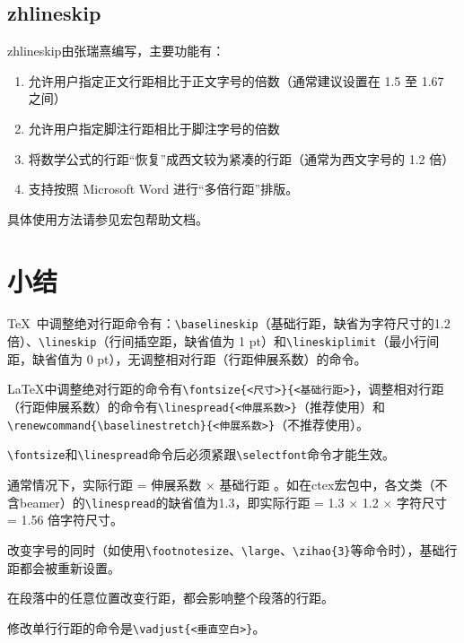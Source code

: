 \documentclass{ctexart}
\newcommand{\pkg}[1]{\textsf{#1}}
\newcommand{\cmd}[1]{\texttt{\textbackslash #1}}
\begin{document}
	\subsection{zhlineskip}
	\pkg{zhlineskip}由张瑞熹编写，主要功能有：
	\begin{enumerate}
		\item 允许用户指定正文行距相比于正文字号的倍数（通常建议设置在 1.5 至 1.67 之间）
		\item 允许用户指定脚注行距相比于脚注字号的倍数
		\item 将数学公式的行距“恢复”成西文较为紧凑的行距（通常为西文字号的 1.2 倍）
		\item 支持按照 Microsoft Word 进行“多倍行距”排版。
	\end{enumerate}
	具体使用方法请参见宏包帮助文档。
	\section{小结}
	
	\TeX\ 中调整绝对行距命令有：\cmd{baselineskip}（基础行距，缺省为字符尺寸的1.2倍）、\cmd{lineskip}（行间插空距，缺省值为 1 pt）和\cmd{lineskiplimit}（最小行间距，缺省值为 0 pt），无调整相对行距（行距伸展系数）的命令。
	
	\LaTeX 中调整绝对行距的命令有\lstinline[basicstyle = \ttfamily]|\fontsize{<尺寸>}{<基础行距>}|，调整相对行距（行距伸展系数）的命令有\lstinline[basicstyle = \ttfamily]|\linespread{<伸展系数>}|（推荐使用）和\lstinline[basicstyle =  \ttfamily]|\renewcommand{\baselinestretch}{<伸展系数>}|（不推荐使用）。
	
	\lstinline[basicstyle = \ttfamily]|\fontsize|和\lstinline[basicstyle = \ttfamily]|\linespread|命令后必须紧跟\lstinline[basicstyle = \ttfamily]|\selectfont|命令才能生效。
	
	通常情况下，实际行距 = 伸展系数 $\times$ 基础行距 。如在ctex宏包中，各文类（不含beamer）的\cmd{linespread}的缺省值为1.3，即实际行距 = 1.3 $\times$ 1.2 $\times$ 字符尺寸 = 1.56 倍字符尺寸。
	
	改变字号的同时（如使用\cmd{footnotesize}、\cmd{large}、\cmd{zihao\{3\}}等命令时），基础行距都会被重新设置。
	
	在段落中的任意位置改变行距，都会影响整个段落的行距。
	
	修改单行行距的命令是\lstinline[basicstyle = \ttfamily]|\vadjust{<垂直空白>}|。
	
	
\end{document}
